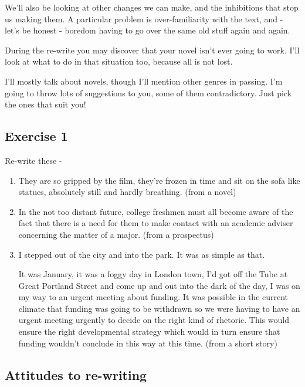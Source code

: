 \documentclass[11pt]{article}
\begin{document}
We'll also be looking at other changes we can make, and the inhibitions that stop
us making them. A particular problem is over-familiarity with the text, and - let's be
honest - boredom having to go over the same old stuff again and again.

During the re-write you may discover that your novel
isn't ever going to work. I'll look at what to do in that situation too, because all is not lost.

I'll mostly talk about novels, though I'll mention other genres in passing. I'm going to throw lots of suggestions to you, some of them contradictory. Just pick the ones that suit you!

\subsection*{Exercise 1}
Re-write these -
\begin{enumerate}
\item They are so gripped by the film, they're frozen in time and sit on the sofa like statues, absolutely still and hardly breathing. (from a novel)


\item In the not too distant future, college freshmen must all become aware of the fact that there is a need for them to make contact with an academic adviser concerning the matter of a major. (from a prospectus)

\item I stepped out of the city and into the park. It was as simple as that.

It was January, it was a foggy day in London town, I'd got off the Tube at Great Portland Street and come up and out into the dark of the day, I was on my way to an urgent meeting about funding. It was possible in the current climate that funding was going to be withdrawn so we were having to have an urgent meeting urgently to decide on the right kind of rhetoric. This would ensure the right developmental strategy which would in turn ensure that funding wouldn't conclude in this way at this time. (from a short story)
\end{enumerate}



\subsection*{Attitudes to re-writing}
\end{document}
